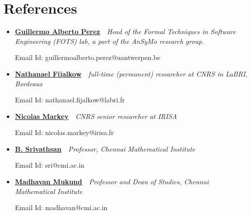 \documentclass[a4paper,10pt]{article}
\begin{document}
\section{References}
\begin{itemize}
\item {\href{https://www.uantwerpen.be/en/staff/guillermoalberto-perez/}{\textbf {Guillermo Alberto Perez}}}\ \ {\textit {Head of the Formal Techniques in Software Engineering (FOTS) lab, a part of the AnSyMo research group.}}
 \begin{description}
  Email Id: 	guillermoalberto.perez@uantwerpen.be  
  \end{description}

\item {\href{https://nathanael-fijalkow.github.io/}{\textbf {Nathanael Fijalkow}}}\ \ {\textit {full-time (permanent) researcher at CNRS in LaBRI, Bordeaux}}
 \begin{description}
  Email Id: nathanael.fijalkow@labri.fr 
  \end{description}

\item {\href{http://people.irisa.fr/Nicolas.Markey/}{\textbf {Nicolas Markey}}}\ \ {\textit {CNRS senior researcher at IRISA}}
 \begin{description}
  Email Id: 	nicolas.markey@irisa.fr  
  \end{description}
  
  \item {\href{https://www.cmi.ac.in/~sri/}{\textbf {B. Srivathsan}}}\ \ {\textit {Professor, Chennai Mathematical Institute}}
 \begin{description}
  Email Id: sri@cmi.ac.in
  \end{description}
 
 \item {\href{http://www.cmi.ac.in/~madhavan/}{\textbf {Madhavan Mukund}}}\ \ {\textit {Professor and Dean of Studies, Chennai Mathematical Institute}}
 \begin{description}
  Email Id: madhavan@cmi.ac.in
  \end{description}
 
\end{itemize}
\end{document}
